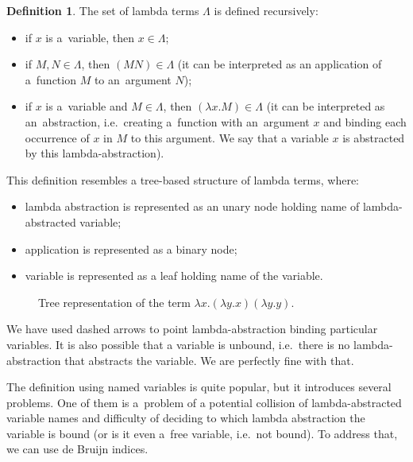 \documentclass[final]{article}
\theoremstyle{definition}
\newtheorem{definition}{Definition}[subsection]
\theoremstyle{definition}
\theoremstyle{remark}
\begin{document}
\begin{definition}
    The set of lambda terms \(\Lambda\) is defined recursively:
    \begin{itemize}
        \item if \(x\) is a~variable, then \(x \in \Lambda\);
        \item if \(M, N \in \Lambda\), then \((M N) \in \Lambda\) (it can be interpreted as an application of a~function \(M\) to an~argument \(N\));
        \item if \(x\) is a~variable and \(M \in \Lambda\), then \((\lambda x. M) \in \Lambda\) (it can be interpreted as an~abstraction, i.e.~creating a~function with an~argument \(x\) and binding each occurrence of \(x\) in \(M\) to this argument. We say that a variable \(x\) is abstracted by this lambda-abstraction).
    \end{itemize}
\end{definition}

This definition resembles a tree-based structure of lambda terms, where:
\begin{itemize}
    \item lambda abstraction is represented as an unary node holding name of lambda-abstracted variable;
    \item application is represented as a binary node;
    \item variable is represented as a leaf holding name of the variable.
\end{itemize}

\begin{figure}[H]
    \centering
    
    \caption{Tree representation of the term \(\lambda x. (\lambda y.x) (\lambda y.y)\).}%
    \label{fig:lambda_tree_example}
\end{figure}

We have used dashed arrows to point lambda-abstraction binding particular variables. It is also possible that a variable is unbound, i.e.~there is no lambda-abstraction that abstracts the variable. We are perfectly fine with that.

The definition using named variables is quite popular, but it introduces several problems. One of them is a~problem of a potential collision of lambda-abstracted variable names and difficulty of deciding to which lambda abstraction the variable is bound (or is it even a~free variable, i.e.~not bound). To address that, we can use de Bruijn indices.
\end{document}
